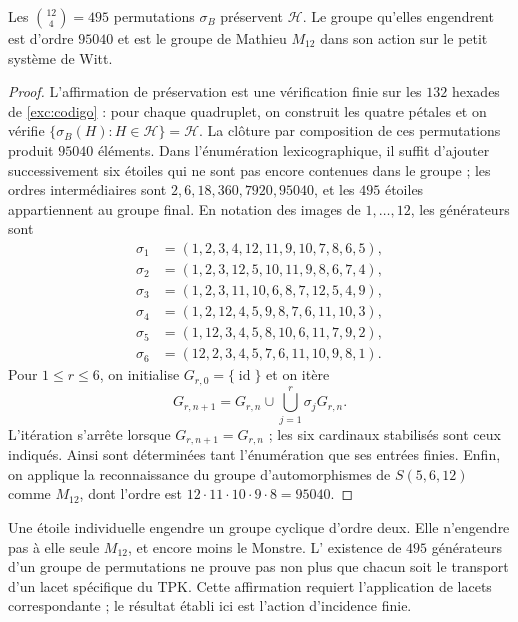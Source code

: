 \begin{proposition}
\label{exc:m12}
Les $\binom{12}4=495$ permutations $\sigma_B$ préservent $\mathcal H$.
Le groupe qu'elles engendrent est d'ordre $95040$ et est le groupe de Mathieu
$M_{12}$ dans son action sur le petit système de Witt.
\end{proposition}

\begin{proof}
L'affirmation de préservation est une vérification finie sur les $132$ hexades de \eqref{exc:codigo} : pour chaque quadruplet, on construit les quatre pétales et on vérifie $\{\sigma_B(H):H\in\mathcal H\}=\mathcal H$. La clôture par composition de ces permutations produit $95040$ éléments. Dans l'énumération lexicographique, il suffit d'ajouter successivement six étoiles qui ne sont pas encore contenues dans le groupe ; les ordres intermédiaires sont $2,6,18,360,7920,95040$, et les $495$ étoiles appartiennent au groupe final. En notation des images de \(1,\ldots,12\), les générateurs sont
\[
\begin{aligned}
 \sigma_1&=(1,2,3,4,12,11,9,10,7,8,6,5),\\
 \sigma_2&=(1,2,3,12,5,10,11,9,8,6,7,4),\\
 \sigma_3&=(1,2,3,11,10,6,8,7,12,5,4,9),\\
 \sigma_4&=(1,2,12,4,5,9,8,7,6,11,10,3),\\
 \sigma_5&=(1,12,3,4,5,8,10,6,11,7,9,2),\\
 \sigma_6&=(12,2,3,4,5,7,6,11,10,9,8,1).
\end{aligned}
\]
Pour \(1\leq r\leq6\), on initialise \(G_{r,0}=\{\operatorname{id}\}\) et on itère
\[
 G_{r,n+1}=G_{r,n}\cup\bigcup_{j=1}^{r}\sigma_jG_{r,n}.
\]
L'itération s'arrête lorsque \(G_{r,n+1}=G_{r,n}\) ; les six
cardinaux stabilisés sont ceux indiqués. Ainsi sont déterminées
tant l'énumération que ses entrées finies. Enfin, on applique la reconnaissance
du groupe d'automorphismes de $S(5,6,12)$ comme $M_{12}$, dont l'ordre est
$12\cdot11\cdot10\cdot9\cdot8=95040$.
\end{proof}

Une étoile individuelle engendre un groupe cyclique d'ordre deux. Elle
n'engendre pas à elle seule $M_{12}$, et encore moins le Monstre. L'
existence de $495$ générateurs d'un groupe de permutations ne prouve pas non plus que
chacun soit le transport d'un lacet spécifique du TPK. Cette affirmation
requiert l'application de lacets correspondante ; le résultat établi ici
est l'action d'incidence finie.

